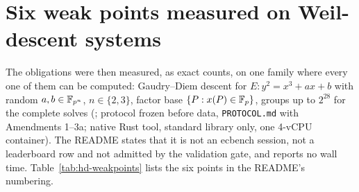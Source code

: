 \section{Six weak points measured on Weil-descent systems}\label{sec:hd-weakpoints}

The obligations were then measured, as exact counts, on one family where
every one of them can be computed: Gaudry--Diem descent for
$E:y^2=x^3+ax+b$ with random $a,b\in\mathbb{F}_{p^n}$, $n\in\{2,3\}$, factor base
$\{P:x(P)\in\mathbb{F}_p\}$, groups up to $2^{28}$ for the complete solves
(; protocol frozen before
data, \texttt{PROTOCOL.md} with Amendments 1--3a; native Rust tool, standard
library only, one 4-vCPU container). The README states that it is not an
ecbench session, not a leaderboard row and not admitted by the validation
gate, and reports no wall time. Table~\ref{tab:hd-weakpoints} lists the six
points in the README's numbering.

